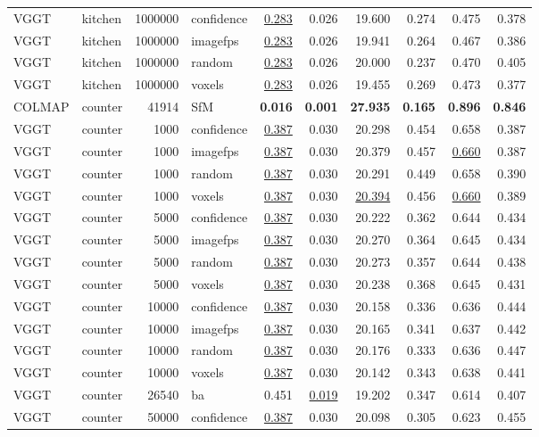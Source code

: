 \begin{table}[H]
\begin{tabular}{llrlrrrrrr}
VGGT & kitchen & 1000000 & confidence & \underline{0.283} & 0.026 & 19.600 & 0.274 & 0.475 & 0.378 \\
VGGT & kitchen & 1000000 & imagefps & \underline{0.283} & 0.026 & 19.941 & 0.264 & 0.467 & 0.386 \\
VGGT & kitchen & 1000000 & random & \underline{0.283} & 0.026 & 20.000 & 0.237 & 0.470 & 0.405 \\
VGGT & kitchen & 1000000 & voxels & \underline{0.283} & 0.026 & 19.455 & 0.269 & 0.473 & 0.377 \\
\midrule
COLMAP & counter & 41914 & SfM & \textbf{0.016} & \textbf{0.001} & \textbf{27.935} & \textbf{0.165} & \textbf{0.896} & \textbf{0.846} \\
VGGT & counter & 1000 & confidence & \underline{0.387} & 0.030 & 20.298 & 0.454 & 0.658 & 0.387 \\
VGGT & counter & 1000 & imagefps & \underline{0.387} & 0.030 & 20.379 & 0.457 & \underline{0.660} & 0.387 \\
VGGT & counter & 1000 & random & \underline{0.387} & 0.030 & 20.291 & 0.449 & 0.658 & 0.390 \\
VGGT & counter & 1000 & voxels & \underline{0.387} & 0.030 & \underline{20.394} & 0.456 & \underline{0.660} & 0.389 \\
VGGT & counter & 5000 & confidence & \underline{0.387} & 0.030 & 20.222 & 0.362 & 0.644 & 0.434 \\
VGGT & counter & 5000 & imagefps & \underline{0.387} & 0.030 & 20.270 & 0.364 & 0.645 & 0.434 \\
VGGT & counter & 5000 & random & \underline{0.387} & 0.030 & 20.273 & 0.357 & 0.644 & 0.438 \\
VGGT & counter & 5000 & voxels & \underline{0.387} & 0.030 & 20.238 & 0.368 & 0.645 & 0.431 \\
VGGT & counter & 10000 & confidence & \underline{0.387} & 0.030 & 20.158 & 0.336 & 0.636 & 0.444 \\
VGGT & counter & 10000 & imagefps & \underline{0.387} & 0.030 & 20.165 & 0.341 & 0.637 & 0.442 \\
VGGT & counter & 10000 & random & \underline{0.387} & 0.030 & 20.176 & 0.333 & 0.636 & 0.447 \\
VGGT & counter & 10000 & voxels & \underline{0.387} & 0.030 & 20.142 & 0.343 & 0.638 & 0.441 \\
VGGT & counter & 26540 & ba & 0.451 & \underline{0.019} & 19.202 & 0.347 & 0.614 & 0.407 \\
VGGT & counter & 50000 & confidence & \underline{0.387} & 0.030 & 20.098 & 0.305 & 0.623 & 0.455 \\

\end{tabular}
\end{table}
